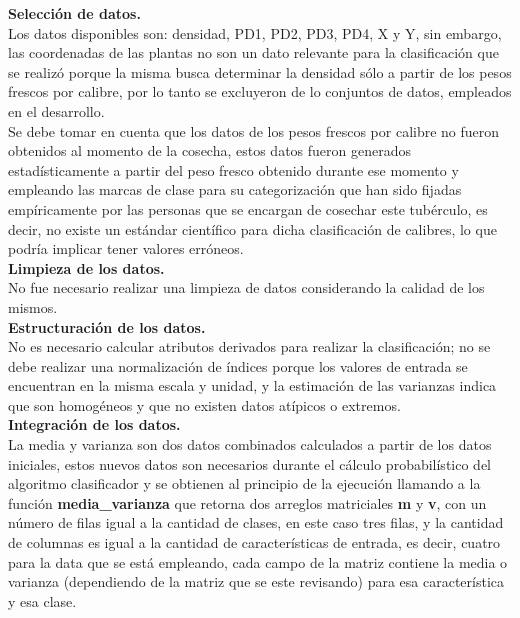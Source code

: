 \noindent
\textbf{Selección de datos.}\\

Los datos disponibles son: densidad, PD1, PD2, PD3, PD4, X y Y, sin embargo, las coordenadas de las
plantas no son un dato relevante para la clasificación que se realizó porque la misma busca determinar
la densidad sólo a partir de los pesos frescos por calibre, por lo tanto se excluyeron de lo conjuntos  de datos, empleados en el desarrollo.\\

Se debe tomar en cuenta que los datos de los pesos frescos por calibre no fueron obtenidos al momento de la cosecha, estos datos fueron generados estadísticamente a partir del peso fresco obtenido durante ese momento y empleando las marcas de clase para su categorización que han sido fijadas empíricamente por las personas que se encargan de cosechar este tubérculo, es decir, no existe un estándar científico para dicha clasificación de calibres, lo que podría implicar tener valores erróneos.\\

\noindent
\textbf{Limpieza de los datos.}\\

No fue necesario realizar una limpieza de datos considerando la calidad de los mismos.\\

\noindent
\textbf{Estructuración de los datos.}\\

No es necesario calcular atributos derivados para realizar la clasificación; no se debe realizar
una normalización de índices porque los valores de entrada se encuentran en la misma escala y unidad, y la estimación de las varianzas indica que son homogéneos y que no existen datos atípicos o extremos.\\

\noindent
\textbf{Integración de los datos.}\\

La media y varianza son dos datos combinados calculados a partir de los datos iniciales, estos nuevos
datos son necesarios durante el cálculo probabilístico del algoritmo clasificador y se
obtienen al principio de la ejecución llamando a la función \textbf{media\_varianza} que retorna
dos arreglos matriciales \textbf{m} y \textbf{v}, con un número de filas igual a la cantidad de clases, en este caso tres filas,
y la cantidad de columnas es igual a la cantidad de características de entrada, es decir, cuatro
para la data que se está empleando, cada campo de la matriz contiene la media o varianza (dependiendo de la
matriz que se este revisando) para esa característica y esa clase.\\

